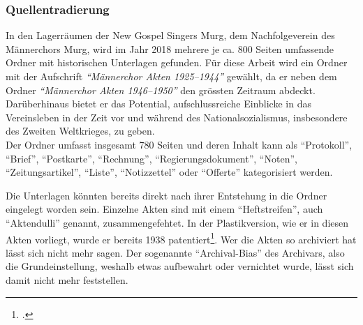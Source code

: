 \documentclass[12pt, a4paper, ngerman, bidi=default]{article}
\let\cite\footcite
\begin{document}
\subsubsection{Quellentradierung}
In den Lagerräumen der New Gospel Singers Murg, dem Nachfolgeverein des Männerchors Murg, 
wird im Jahr 2018 mehrere je ca. 800 Seiten umfassende Ordner mit historischen Unterlagen gefunden. 
Für diese Arbeit wird ein Ordner mit der Aufschrift \textit{\enquote{Männerchor Akten 1925--1944}} gewählt, da er neben dem Ordner 
\textit{\enquote{Männerchor Akten 1946--1950}} den grössten Zeitraum abdeckt. Darüberhinaus bietet er das Potential, 
aufschlussreiche Einblicke in das Vereinsleben in der Zeit vor und während des Nationalsozialismus, insbesondere des Zweiten Weltkrieges, zu geben.\\ 
Der Ordner umfasst insgesamt 780 Seiten und deren Inhalt kann als \enquote{Protokoll}, \enquote{Brief}, \enquote{Postkarte}, \enquote{Rechnung}, 
\enquote{Regierungsdokument}, \enquote{Noten}, \enquote{Zeitungsartikel}, \enquote{Liste}, \enquote{Notizzettel} oder \enquote{Offerte} kategorisiert werden.

Die Unterlagen könnten bereits direkt nach ihrer Entstehung in die Ordner eingelegt worden sein. Einzelne Akten sind mit einem 
\enquote{Heftstreifen}, auch \enquote{Aktendulli} genannt, zusammengefehtet. In der Plastikversion, wie er in diesen Akten vorliegt, wurde er bereits 1938 patentiert\cite[vgl.][]{noauthor_heftstreifen_2023}.
Wer die Akten so archiviert hat lässt sich nicht mehr sagen. 
Der sogenannte \enquote{Archival-Bias} des Archivars, also die Grundeinstellung, weshalb etwas aufbewahrt oder
vernichtet wurde, lässt sich damit nicht mehr feststellen. 
\end{document}
